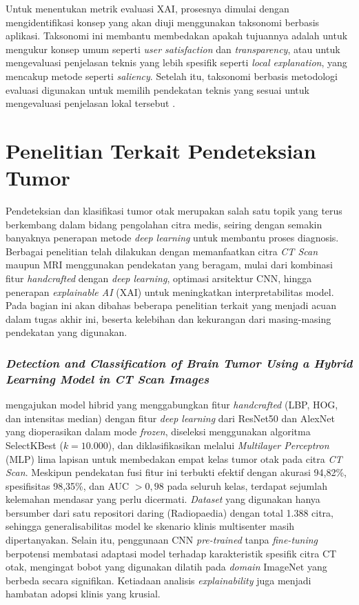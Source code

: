 Untuk menentukan metrik evaluasi XAI, prosesnya dimulai dengan mengidentifikasi konsep yang akan diuji menggunakan taksonomi berbasis aplikasi. Taksonomi ini membantu membedakan apakah tujuannya adalah untuk mengukur konsep umum seperti \textit{user satisfaction} dan \textit{transparency}, atau untuk mengevaluasi penjelasan teknis yang lebih spesifik seperti \textit{local explanation}, yang mencakup metode seperti \textit{saliency}. Setelah itu, taksonomi berbasis metodologi evaluasi digunakan untuk memilih pendekatan teknis yang sesuai untuk mengevaluasi penjelasan lokal tersebut \autocite{kadir2023evaluation}.

\section{Penelitian Terkait Pendeteksian Tumor}
\label{sec:penelitian terkait tumor}
Pendeteksian dan klasifikasi tumor otak merupakan salah satu topik yang terus berkembang dalam bidang pengolahan citra medis, seiring dengan semakin banyaknya penerapan metode \textit{deep learning} untuk membantu proses diagnosis. Berbagai penelitian telah dilakukan dengan memanfaatkan citra \textit{CT Scan} maupun MRI menggunakan pendekatan yang beragam, mulai dari kombinasi fitur \textit{handcrafted} dengan \textit{deep learning}, optimasi arsitektur CNN, hingga penerapan \textit{explainable AI} (XAI) untuk meningkatkan interpretabilitas model. Pada bagian ini akan dibahas beberapa penelitian terkait yang menjadi acuan dalam tugas akhir ini, beserta kelebihan dan kekurangan dari masing-masing pendekatan yang digunakan.

\subsubsection{\textit{Detection and Classification of Brain Tumor Using a Hybrid Learning Model in CT Scan Images}} \label{subsubsec:hybrid_tumor}
\textcite{ghasemi2025detection} mengajukan model hibrid yang menggabungkan fitur \textit{handcrafted} (LBP, HOG, dan intensitas median) dengan fitur \textit{deep learning} dari ResNet50 dan AlexNet yang dioperasikan dalam mode \textit{frozen}, diseleksi menggunakan algoritma SelectKBest ($k = 10.000$), dan diklasifikasikan melalui \textit{Multilayer Perceptron} (MLP) lima lapisan untuk membedakan empat kelas tumor otak pada citra \textit{CT Scan}. Meskipun pendekatan fusi fitur ini terbukti efektif dengan akurasi 94,82\%, spesifisitas 98,35\%, dan AUC $> 0,98$ pada seluruh kelas, terdapat sejumlah kelemahan mendasar yang perlu dicermati. \textit{Dataset} yang digunakan hanya bersumber dari satu repositori daring (Radiopaedia) dengan total 1.388 citra, sehingga generalisabilitas model ke skenario klinis multisenter masih dipertanyakan. Selain itu, penggunaan CNN \textit{pre-trained} tanpa \textit{fine-tuning} berpotensi membatasi adaptasi model terhadap karakteristik spesifik citra CT otak, mengingat bobot yang digunakan dilatih pada \textit{domain} ImageNet yang berbeda secara signifikan. Ketiadaan analisis \textit{explainability} juga menjadi hambatan adopsi klinis yang krusial.

